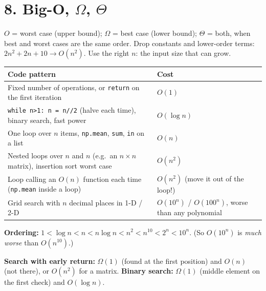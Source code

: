 \documentclass[10pt]{article}
\newcommand{\code}[1]{\lstinline[basicstyle=\ttfamily\small]{#1}}
\begin{document}
\section*{8. Big-O, $\Omega$, $\Theta$}
\begin{keyrule}
$O$ = worst case (upper bound); $\Omega$ = best case (lower bound); $\Theta$ = both, when best and worst cases are the same order. Drop constants and lower-order terms: $2n^2+2n+10 \to O(n^2)$. Use the right $n$: the input size that can grow.
\end{keyrule}
\begin{center}
\small
\begin{tabular}{p{}p{}}
\hline
\textbf{Code pattern} & \textbf{Cost} \\ \hline
Fixed number of operations, or \code{return} on the first iteration & $O(1)$ \\
\code{while n>1: n = n//2} (halve each time), binary search, fast power & $O(\log n)$ \\
One loop over $n$ items, \code{np.mean}, \code{sum}, \code{in} on a list & $O(n)$ \\
Nested loops over $n$ and $n$ (e.g.\ an $n\times n$ matrix), insertion sort worst case & $O(n^2)$ \\
Loop calling an $O(n)$ function each time (\code{np.mean} inside a loop) & $O(n^2)$ (move it out of the loop!) \\
Grid search with $n$ decimal places in 1-D / 2-D & $O(10^n)$ / $O(100^n)$, worse than any polynomial \\ \hline
\end{tabular}
\end{center}
\textbf{Ordering:} $1 < \log n < n < n\log n < n^2 < n^{10} < 2^n < 10^n$. (So $O(10^n)$ is \emph{much worse} than $O(n^{10})$.)

\textbf{Search with early return:} $\Omega(1)$ (found at the first position) and $O(n)$ (not there), or $O(n^2)$ for a matrix. \textbf{Binary search:} $\Omega(1)$ (middle element on the first check) and $O(\log n)$.

\end{document}
